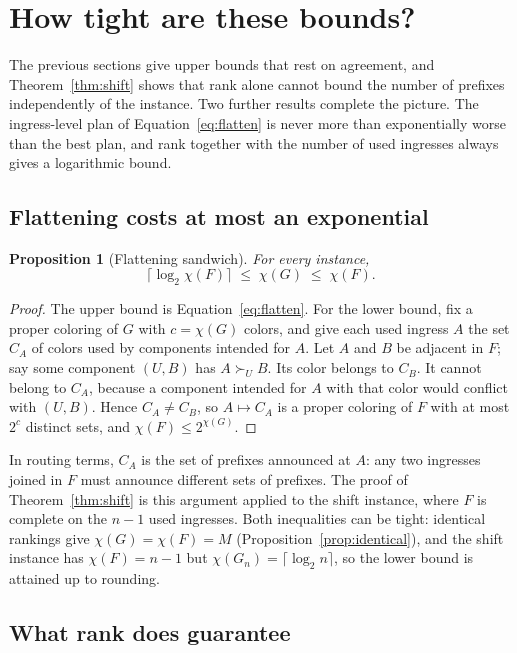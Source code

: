 \documentclass[10pt,a4paper]{article}
\newtheorem{proposition}[theorem]{Proposition}
\begin{document}
\section{How tight are these bounds?}
\label{sec:tightness}

The previous sections give upper bounds that rest on agreement, and Theorem~\ref{thm:shift} shows that rank alone cannot bound the number of prefixes independently of the instance. Two further results complete the picture. The ingress-level plan of Equation~\eqref{eq:flatten} is never more than exponentially worse than the best plan, and rank together with the number of used ingresses always gives a logarithmic bound.

\subsection{Flattening costs at most an exponential}

\begin{proposition}[Flattening sandwich]\label{prop:sandwich}
For every instance,
\[
\lceil\log_2\chi(F)\rceil\;\le\;\chi(G)\;\le\;\chi(F).
\]
\end{proposition}
\begin{proof}
The upper bound is Equation~\eqref{eq:flatten}. For the lower bound, fix a proper coloring of $G$ with $c=\chi(G)$ colors, and give each used ingress $A$ the set $C_A$ of colors used by components intended for $A$. Let $A$ and $B$ be adjacent in $F$; say some component $(U,B)$ has $A\succ_U B$. Its color belongs to $C_B$. It cannot belong to $C_A$, because a component intended for $A$ with that color would conflict with $(U,B)$. Hence $C_A\ne C_B$, so $A\mapsto C_A$ is a proper coloring of $F$ with at most $2^c$ distinct sets, and $\chi(F)\le 2^{\chi(G)}$.
\end{proof}

In routing terms, $C_A$ is the set of prefixes announced at $A$: any two ingresses joined in $F$ must announce different sets of prefixes. The proof of Theorem~\ref{thm:shift} is this argument applied to the shift instance, where $F$ is complete on the $n-1$ used ingresses. Both inequalities can be tight: identical rankings give $\chi(G)=\chi(F)=M$ (Proposition~\ref{prop:identical}), and the shift instance has $\chi(F)=n-1$ but $\chi(G_n)=\lceil\log_2 n\rceil$, so the lower bound is attained up to rounding.

\subsection{What rank does guarantee}
\end{document}
